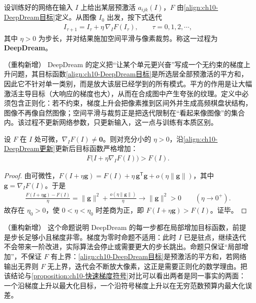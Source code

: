 \documentclass[../../main.tex]{subfiles}
\begin{document}
\begin{definition}[DeepDream]\label{definition:ch10-DeepDream}
设训练好的网络在输入 $I$ 上给出某层预激活 $a_{ijk}(I)$，$F$ 由\eqref{align:ch10-DeepDream目标}定义。从图像 $I_0$ 出发，按下式迭代
\begin{align}
  I_{\tau+1}=I_{\tau}+\eta\,\nabla_{I}F(I_{\tau}),\qquad \tau=0,1,2,\cdots,
  \label{align:ch10-DeepDream更新}
\end{align}
其中 $\eta>0$ 为步长，并对结果施加空间平滑与像素裁剪。称这一过程为 \textbf{DeepDream}。
\end{definition}

\begin{remark}（重构新增）
DeepDream 的定义把“让某个单元更兴奋”写成一个无约束的梯度上升问题，其目标函数\eqref{align:ch10-DeepDream目标}是所选层全部预激活的平方和，因此它不针对单一类别，而是放大该层已经学到的所有模式。平方的作用是让大幅激活主导目标（大响应的梯度也大），从而在合成图中产生夸张的纹理。定义中必须包含正则化：若不约束，梯度上升会把像素推到区间外并生成高频棋盘状结构，图像不再像自然图像；空间平滑与裁剪正是把迭代限制在“看起来像图像”的集合内。该过程不更新网络参数，只更新输入，这一点与训练有本质区别。
\end{remark}

\begin{proposition}\label{proposition:ch10-DeepDream上升}
设 $F$ 在 $I$ 处可微，$\nabla_IF(I)\neq\mathbf{0}$。则对充分小的 $\eta>0$，沿\eqref{align:ch10-DeepDream更新}更新后目标函数严格增加：
\begin{align}
  F\bigl(I+\eta\nabla_IF(I)\bigr)>F(I).
  \label{align:ch10-DeepDream上升}
\end{align}
\end{proposition}
\begin{proof}
由可微性，$F(I+\eta\mathbf{g})=F(I)+\eta\,\mathbf{g}^{\mathsf{T}}\mathbf{g}+o(\eta\|\mathbf{g}\|)$，其中 $\mathbf{g}=\nabla_IF(I)$。于是
\begin{align*}
  \frac{F(I+\eta\mathbf{g})-F(I)}{\eta}=\|\mathbf{g}\|^2+\frac{o(\eta\|\mathbf{g}\|)}{\eta}\longrightarrow\|\mathbf{g}\|^2>0\qquad(\eta\to0^{+}).
\end{align*}
故存在 $\eta_0>0$，使 $0<\eta<\eta_0$ 时差商为正，即 $F(I+\eta\mathbf{g})>F(I)$。证毕。
\end{proof}

\begin{remark}（重构新增）
这个命题说明 DeepDream 的每一步都在局部增加目标函数，前提是步长足够小且梯度非零。梯度为零时命题不适用：此时 $I$ 已是驻点，继续迭代不会带来一阶改进，实际算法会停止或需要更大的步长跳出。命题只保证“局部增加”，不保证 $F$ 有上界：\eqref{align:ch10-DeepDream目标}是预激活的平方和，若网络输出无界则 $F$ 无上界，迭代会不断放大像素，这正是需要正则化的数学理由。把该结论与\cref{proposition:ch10-快速梯度符号}对比可以看出两者是同一事实的两面：一个沿梯度上升以最大化目标，一个沿符号梯度上升以在无穷范数预算内最大化误差。
\end{remark}
\end{document}
